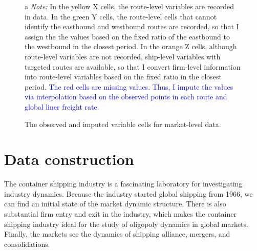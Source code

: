 \begin{landscape}
{\begin{figure}[!ht]
\begin{minipage}[b]{0.45\linewidth}
  \end{minipage}
\caption{The observed and imputed variable cells for market-level data.}
{\tiny{}
\begin{tablenotes}
\item[a]\textit{Note:} In the yellow X cells, the route-level variables are recorded in data. In the green Y cells, the route-level cells that cannot identify the eastbound and westbound routes are recorded, so that I assign the the values based on the fixed ratio of the eastbound to the westbound in the closest period. In the orange Z cells, although route-level variables are not recorded, ship-level variables with targeted routes are available, so that I convert firm-level information into route-level variables based on the fixed ratio in the closest period. \textcolor{blue}{The red cells are missing values. Thus, I impute the values via interpolation based on the observed points in each route and global liner freight rate.}
\end{tablenotes}
}
\end{figure}
}
\end{landscape}

\section{Data construction}\label{sec:data_construction}

The container shipping industry is a fascinating laboratory for investigating industry dynamics. Because the industry started global shipping from 1966, we can find an initial state of the market dynamic structure. There is also substantial firm entry and exit in the industry, which makes the container shipping industry ideal for the study of oligopoly dynamics in global markets. Finally, the markets see the dynamics of shipping alliance, mergers, and consolidations. 

